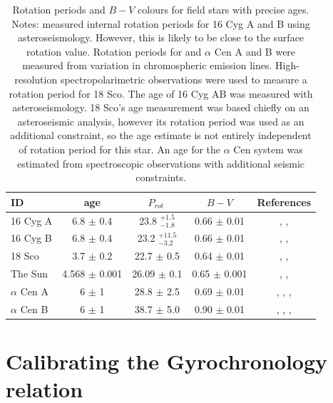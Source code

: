 \documentclass[useAMS, usenatbib]{mn2e}
\newcommand{\prot}{$P_{rot}~$}
\begin{document}
\begin{table}
\caption{Rotation periods and $B-V$ colours for field stars with precise
	ages.
Notes: \citet{Davies2014} measured internal rotation periods for 16 Cyg A and B
using asteroseismology.
However, this is likely to be close to the surface rotation value.
Rotation periods for and $\alpha$ Cen A and B were measured
from variation in chromospheric emission lines.
High-resolution spectropolarimetric observations were used to measure
a rotation period for 18 Sco.
The age of 16 Cyg AB was measured with asteroseismology.
18 Sco's age measurement was based chiefly on an asteroseismic analysis,
however its rotation period was used as an additional constraint, so the age
estimate is not entirely independent of rotation period for this star.
An age for the $\alpha$ Cen system was estimated from spectroscopic
observations with additional seismic constraints.\label{tab:field}}

\begin{tabular}{lcccc}
\hline\hline
{ID} & {age} & {\prot} & {$B-V$} & References\\
\hline
16 Cyg A & 6.8 $\pm$ 0.4 & 23.8 $^{+1.5}_{-1.8}$ & 0.66 $\pm$ 0.01 &
\citet{Metcalfe2012}, \citet{Davies2014}, \citet{Moffett1979} \\
16 Cyg B & 6.8 $\pm$ 0.4 & 23.2 $^{+11.5}_{-3.2}$ & 0.66 $\pm$ 0.01 &
\citet{Metcalfe2012}, \citet{Davies2014}, \citet{Moffett1979} \\
18 Sco & 3.7 $\pm$ 0.2 & 22.7 $\pm$ 0.5 & 0.64 $\pm$ 0.01 &
\citet{Li2012}, \citet{Petit2008}, \citet{Mermilliod1986} \\
The Sun & 4.568 $\pm$ 0.001 & 26.09 $\pm$ 0.1 & 0.65 $\pm$ 0.001 &
\citet{Bouvier2010}, \citet{Donahue1996}, \citet{Cox2000} \\
$\alpha$ Cen A & 6 $\pm$ 1 & 28.8 $\pm$ 2.5 &
0.69 $\pm$ 0.01 &
\citet{Bazot2012}, \citet{Yildiz2007}, \citet{Hallam1991}, \citet{Mermilliod1986}\\
$\alpha$ Cen B & 6 $\pm$ 1 & 38.7 $\pm$ 5.0 &
0.90 $\pm$ 0.01 &
\citet{Bazot2012}, \citet{Yildiz2007}, \citet{Dumusque2012}, \citet{Mermilliod1986} \\
\hline
\end{tabular}
\end{table}

\section{Calibrating the Gyrochronology relation}
\label{sec:gyro_cal}
\end{document}
